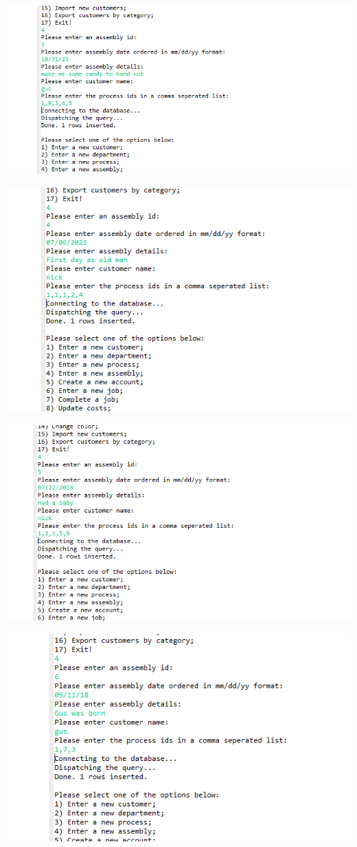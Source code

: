 \documentclass[11pt]{article}
\begin{document}
\includegraphics[width = \textwidth]{ass1.png}

\includegraphics[width = \textwidth]{ass2.png}

\includegraphics[width = \textwidth]{ass3.png}

\includegraphics[width = \textwidth]{ass4.png}
\end{document}
